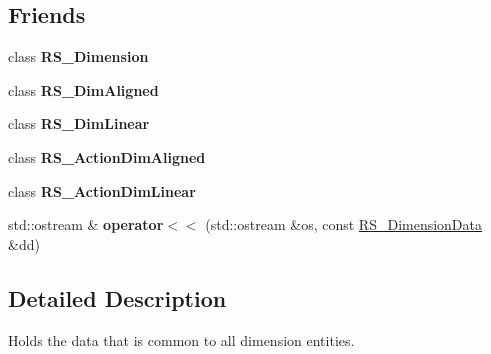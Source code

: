 \subsection*{Friends}
\begin{DoxyCompactItemize}
\item 
\hypertarget{classRS__DimensionData_a83c0ec5a9b4ec9f78136bd76101d6d24}{class {\bfseries R\-S\-\_\-\-Dimension}}\label{classRS__DimensionData_a83c0ec5a9b4ec9f78136bd76101d6d24}

\item 
\hypertarget{classRS__DimensionData_aea188e8c51baa951f78b172cf77aedcc}{class {\bfseries R\-S\-\_\-\-Dim\-Aligned}}\label{classRS__DimensionData_aea188e8c51baa951f78b172cf77aedcc}

\item 
\hypertarget{classRS__DimensionData_ab81aaab1236c306688e15c4843df4b98}{class {\bfseries R\-S\-\_\-\-Dim\-Linear}}\label{classRS__DimensionData_ab81aaab1236c306688e15c4843df4b98}

\item 
\hypertarget{classRS__DimensionData_adf89e7a13764cd7fd4c9abe0aef55d17}{class {\bfseries R\-S\-\_\-\-Action\-Dim\-Aligned}}\label{classRS__DimensionData_adf89e7a13764cd7fd4c9abe0aef55d17}

\item 
\hypertarget{classRS__DimensionData_ae34cbb28982a4bca7e05e1d7632208a1}{class {\bfseries R\-S\-\_\-\-Action\-Dim\-Linear}}\label{classRS__DimensionData_ae34cbb28982a4bca7e05e1d7632208a1}

\item 
\hypertarget{classRS__DimensionData_accdf9d8962e554f066ddda90c3db28a5}{std\-::ostream \& {\bfseries operator$<$$<$} (std\-::ostream \&os, const \hyperlink{classRS__DimensionData}{R\-S\-\_\-\-Dimension\-Data} \&dd)}\label{classRS__DimensionData_accdf9d8962e554f066ddda90c3db28a5}

\end{DoxyCompactItemize}


\subsection{Detailed Description}
Holds the data that is common to all dimension entities. 

